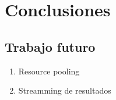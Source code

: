 \chapter{Conclusiones}

\section{Trabajo futuro}

\begin{enumerate}
\item{Resource pooling}
\item{Streamming de resultados}
\end{enumerate}
